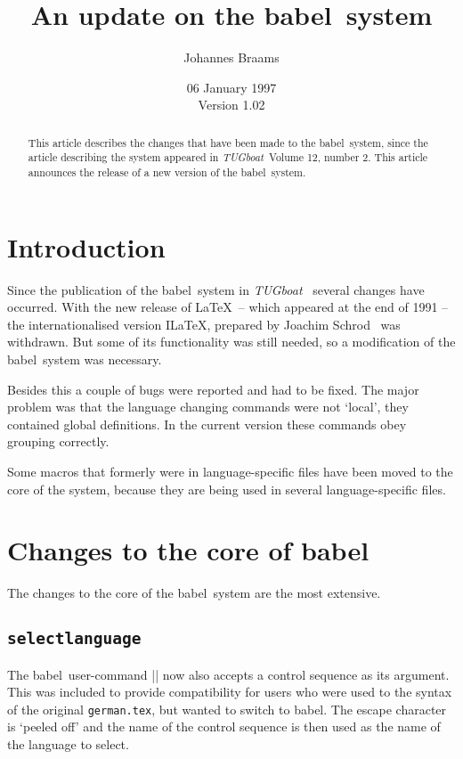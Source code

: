 \documentclass{ltugboat}
\newcommand\address[1]{}
\newcommand\netaddress[1]{}
\newcommand\TUB{\textsl{TUGboat\/}}
\newcommand{\file}[1]{\texttt{#1}}
\newcommand{\babel}{\textsf{babel}}
\newcommand{\bsl}{\protect\bslash}
\begin{document}
\title{An update on the \babel\ system}
\author{Johannes Braams}
\address{%
  \TeX niek\\
  Kersengaarde 33\\
  2723 BP Zoetermeer\\
  The Netherlands}
\netaddress{babel@braams.cistron.nl}
\date{06 January 1997 \\
  Version 1.02}
\maketitle

\begin{abstract}
  This article describes the changes that have been made to the
  \babel\ system, since the article describing the system appeared in
  \TUB\ Volume 12, number 2. This article announces the release of a
  new version of the \babel\ system.
\end{abstract}

\section{Introduction}

Since the publication of the \babel\ system in \TUB~\cite{bab} several
changes have occurred. With the new release of \LaTeX\ -- which
appeared at the end of 1991 -- the internationalised version I\LaTeX,
prepared by Joachim Schrod~\cite{ilatex} was withdrawn. But some of
its functionality was still needed, so a modification of the \babel\
system was necessary.

Besides this a couple of bugs were reported and had to be fixed. The
major problem was that the language changing commands were not
`local', they contained global definitions. In the current version
these commands obey grouping correctly.

Some macros that formerly were in language-specific files have been
moved to the core of the system, because they are being used in
several language-specific files.

\section{Changes to the core of \babel}

The changes to the core of the \babel\ system are the most extensive.

\subsection*{{\tt\bsl selectlanguage}}
The \babel\ user-command |\selectlanguage| now also accepts a control
sequence as its argument. This was included to provide compatibility
for users who were used to the syntax of the original
\file{german.tex}, but wanted to switch to \babel.  The escape
character is `peeled off' and the name of the control sequence is then
used as the name of the language to select.
\end{document}
